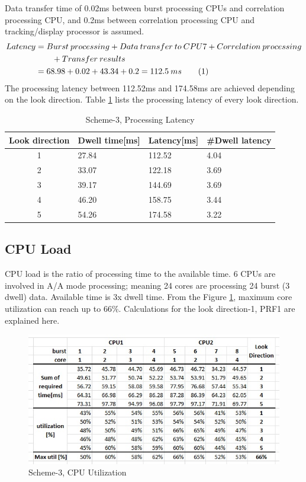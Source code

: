 Data transfer time of 0.02ms between burst processing CPUs and correlation processing CPU, and 0.2ms between correlation processing CPU and tracking/display processor is assumed.
\begin{align*}
	Latency &= Burst \: processing + Data \: transfer \: to \: CPU7 + Correlation \: processing \\
		& \qquad + Transfer \: results  \\
		&= 68.98 + 0.02 + 43.34 + 0.2 = 112.5 \: ms  \stepcounter{equation}\tag{\theequation}
\end{align*}
The processing latency between 112.52ms and 174.58ms are achieved depending on the look direction. Table \ref{tbl:mm:scheme4_latency} lists the processing latency of every look direction.
\begin{table}[h!]
	\centering
	\begin{tabular}{|c|l|l|l|} 
	 \hline
	 \textbf{Look direction} & \textbf{Dwell time[ms]} & \textbf{Latency[ms]} & \textbf{\#Dwell latency} \\
	 \hline
	 1 & 27.84 & 112.52 & 4.04 \\ \hline
	 2 & 33.07 & 122.18 & 3.69 \\ \hline
	 3 & 39.17 & 144.69 & 3.69 \\ \hline
	 4 & 46.20 & 158.75 & 3.44 \\ \hline
	 5 & 54.26 & 174.58 & 3.22 \\ \hline
	\end{tabular}
	\caption{Scheme-3, Processing Latency}
	\label{tbl:mm:scheme4_latency}
\end{table}
\FloatBarrier

\subsection{CPU Load}
\label{ss:mm:scheme4:cpu_load}
CPU load is the ratio of processing time to the available time. 6 CPUs are involved in A/A mode processing; meaning 24 cores are processing 24 burst (3 dwell) data. Available time is 3x dwell time. From the Figure \ref{fig:mm:scheme4_util}, maximum core utilization can reach up to 66\%. Calculations for the look direction-1, PRF1 are explained here.
\begin{figure}[h!]
	\centering
	\includegraphics[width=140mm]{figures/scheme4_util}
	\caption{Scheme-3, CPU Utilization}
	\label{fig:mm:scheme4_util}
\end{figure}

